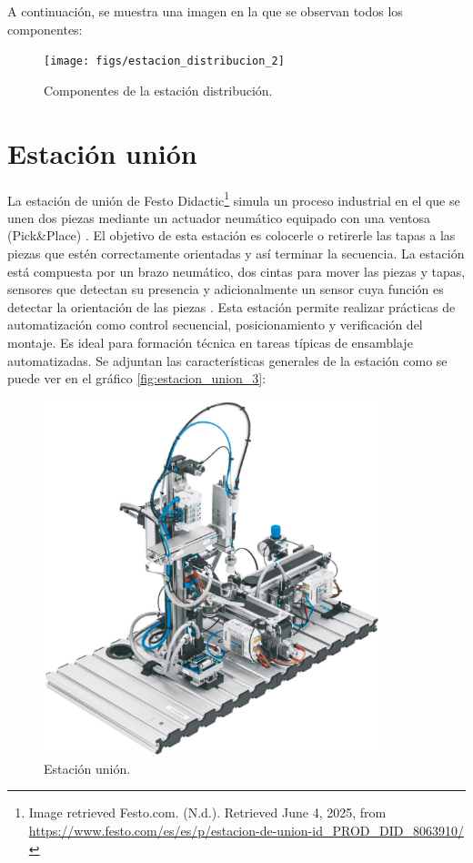 A continuación, se muestra una imagen en la que se observan todos los componentes:

\begin{figure} [h!]
  \begin{center}
    \texttt{[image: figs/estacion\_distribucion\_2]}
  \end{center}
  \caption{\centering Componentes de la estación distribución.}
  \label{fig:estacion_distribucion_2}
\end{figure} 

\section{Estación unión}
\label{sec:estacion_union}

La estación de unión de Festo Didactic\footnote{Image retrieved Festo.com.  (N.d.). Retrieved June 4, 2025, from  \url{https://www.festo.com/es/es/p/estacion-de-union-id_PROD_DID_8063910/}} simula un proceso industrial en el que se unen dos piezas mediante un actuador neumático equipado con una ventosa (Pick\&Place) \cite{estacion_union}. El objetivo de esta estación es colocerle o retirerle las tapas a las piezas que estén correctamente orientadas y así terminar la secuencia. La estación está compuesta por un brazo neumático, dos cintas para mover las piezas y tapas, sensores que detectan su presencia y adicionalmente un sensor cuya función es detectar la orientación de las piezas \cite{estacion_union}. Esta estación permite realizar prácticas de automatización como control secuencial, posicionamiento y verificación del montaje. Es ideal para formación técnica en tareas típicas de ensamblaje automatizadas. Se adjuntan las características generales de la estación como se puede ver en el gráfico \ref{fig:estacion_union_3}:


\begin{figure} [h!]
  \begin{center}
    \includegraphics[width=9.75cm]{figs/estacion_union_1}
  \end{center}
  \caption{\centering Estación unión. \cite{estacion_union}}
  \label{fig:estacion_union_1}
\end{figure} 

